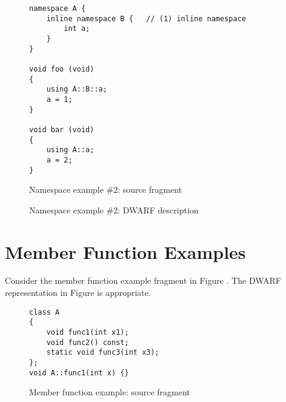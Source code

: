 \begin{figure}[h]
\begin{lstlisting}
namespace A {
    inline namespace B {   // (1) inline namespace
        int a;
    }
}

void foo (void)
{
    using A::B::a;
    a = 1;
}

void bar (void)
{
    using A::a;
    a = 2;
}
\end{lstlisting}
\caption{Namespace example \#2: source fragment}
\label{fig:namespaceexample2sourcefragment}
\end{figure}

\begin{figure}[h]
\caption{Namespace example \#2: DWARF description}
\label{fig:namespaceexample2dwarfdescription}
\end{figure}

\clearpage
\section{Member Function Examples}
\label{app:memberfunctionexample}
Consider the member function example fragment in 
Figure .
The DWARF representation in 
Figure 
is appropriate.

\begin{figure}[h]
\begin{lstlisting}
class A
{
    void func1(int x1);
    void func2() const;
    static void func3(int x3);
};
void A::func1(int x) {}
\end{lstlisting}
\caption{Member function example: source fragment}
\label{fig:memberfunctionexamplesourcefragment}
\end{figure}

